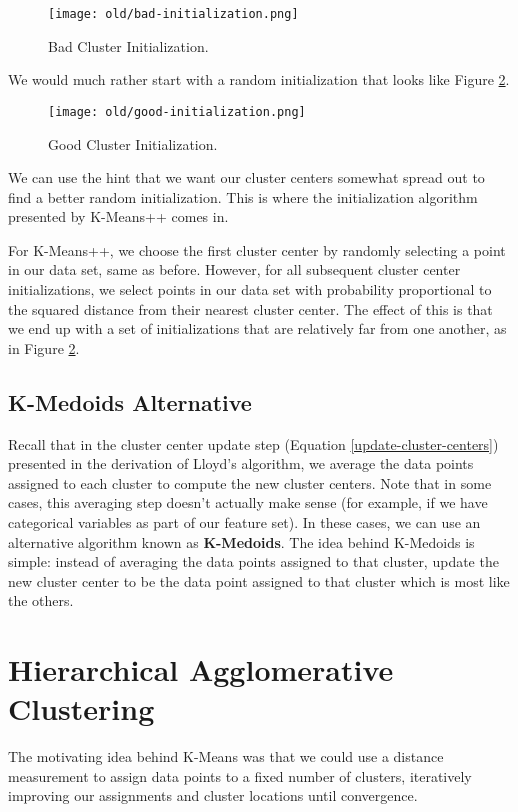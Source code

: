 \begin{figure}
    \centering
    \texttt{[image: old/bad-initialization.png]}
    \caption{Bad Cluster Initialization.}
    \label{fig:bad-init}
\end{figure}

We would much rather start with a random initialization that looks like Figure \ref{fig:good-init}.

\begin{figure}
    \centering
    \texttt{[image: old/good-initialization.png]}
    \caption{Good Cluster Initialization.}
    \label{fig:good-init}
\end{figure}

We can use the hint that we want our cluster centers somewhat spread out to find a better random initialization. This is where the initialization algorithm presented by K-Means++ comes in.

For K-Means++, we choose the first cluster center by randomly selecting a point in our data set, same as before. However, for all subsequent cluster center initializations, we select points in our data set with probability proportional to the squared distance from their nearest cluster center. The effect of this is that we end up with a set of initializations that are relatively far from one another, as in Figure \ref{fig:good-init}.

\subsection{K-Medoids Alternative}
Recall that in the cluster center update step (Equation \ref{update-cluster-centers}) presented in the derivation of Lloyd's algorithm, we average the data points assigned to each cluster to compute the new cluster centers. Note that in some cases, this averaging step doesn't actually make sense (for example, if we have categorical variables as part of our feature set). In these cases, we can use an alternative algorithm known as \textbf{K-Medoids}. The idea behind K-Medoids is simple: instead of averaging the data points assigned to that cluster, update the new cluster center to be the data point assigned to that cluster which is most like the others.

\section{Hierarchical Agglomerative Clustering}
The motivating idea behind K-Means was that we could use a distance measurement to assign data points to a fixed number of clusters, iteratively improving our assignments and cluster locations until convergence.

